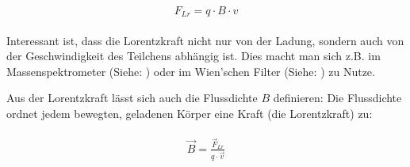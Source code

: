 \begin{align} \label{eq:Lorentzkraft}
\begin{split}
	F_{Lr} = q \cdot B \cdot v
\end{split}
\end{align}

\noindent Interessant ist, dass die Lorentzkraft nicht nur von der Ladung, sondern auch von der Geschwindigkeit des Teilchens abhängig ist. Dies macht man sich z.B. im Massenspektrometer (Siehe: ) oder im Wien'schen Filter (Siehe: ) zu Nutze.

Aus der Lorentzkraft lässt sich auch die Flussdichte $B$ definieren: Die Flussdichte ordnet jedem bewegten, geladenen Körper eine Kraft (die Lorentzkraft) zu:

\begin{align} \label{eq:Flussdichte}
\begin{split}
	\vec{B} = \frac{\vec{F}_{Lr}}{q \cdot \vec{v}}
\end{split}
\end{align}






